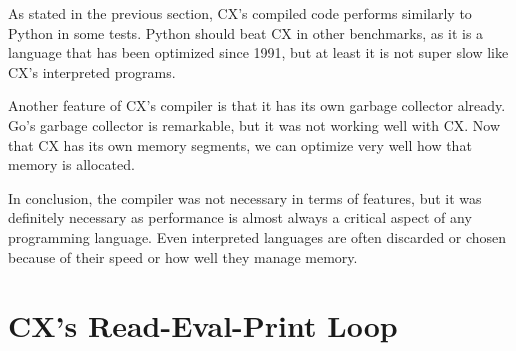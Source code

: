 \documentclass[11pt,fleqn,openany]{book} %
\begin{document}
As stated in the previous section, CX's compiled code performs similarly to Python in some tests. Python should beat CX in other benchmarks, as it is a language that has been optimized since 1991, but at least it is not super slow like CX's interpreted programs.

Another feature of CX's compiler is that it has its own garbage collector already. Go's garbage collector is remarkable, but it was not working well with CX. Now that CX has its own memory segments, we can optimize very well how that memory is allocated.

In conclusion, the compiler was not necessary in terms of features, but it was definitely necessary as performance is almost always a critical aspect of any programming language. Even interpreted languages are often discarded or chosen because of their speed or how well they manage memory.


\chapter{CX's Read-Eval-Print Loop}
\label{chapter:mastering-the-repl}

\end{document}
